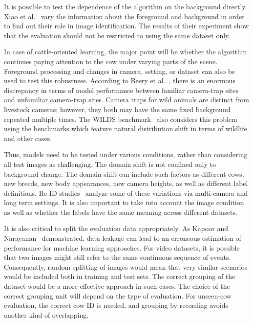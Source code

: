 It is possible to test the dependence of the algorithm on the background directly. Xiao et al.~\cite{xiao2021background} vary the information about the foreground and background in order to find out their role in image identification. The results of their experiment show that the evaluation should not be restricted to using the same dataset only.

In case of cattle-oriented learning, the major point will be whether the algorithm continues paying attention to the cow under varying parts of the scene. Foreground processing and changes in camera, setting, or dataset can also be used to test this robustness. According to Beery et al.~\cite{beery2018terra}, there is an enormous discrepancy in terms of model performance between familiar camera-trap sites and unfamiliar camera-trap sites. Camera traps for wild animals are distinct from livestock cameras; however, they both may have the same fixed background repeated multiple times. The WILDS benchmark~\cite{koh2021wilds} also considers this problem using the benchmarks which feature natural distribution shift in terms of wildlife and other cases.

Thus, models need to be tested under various conditions, rather than considering all test images as challenging. The domain shift is not confined only to background change. The domain shift can include such factors as different cows, new breeds, new body appearances, new camera heights, as well as different label definitions. Re-ID studies~\cite{yu2025multicam,zhang2026beca} analyze some of these variations via multi-camera and long term settings. It is also important to take into account the image condition as well as whether the labels have the same meaning across different datasets.

It is also critical to split the evaluation data appropriately. As Kapoor and Narayanan~\cite{kapoor2023leakage} demonstrated, data leakage can lead to an erroneous estimation of performance for machine learning approaches. For video datasets, it is possible that two images might still refer to the same continuous sequence of events. Consequently, random splitting of images would mean that very similar scenarios would be included both in training and test sets. The correct grouping of the dataset would be a more effective approach in such cases. The choice of the correct grouping unit will depend on the type of evaluation. For unseen-cow evaluation, the correct cow ID is needed, and grouping by recording avoids another kind of overlapping.

